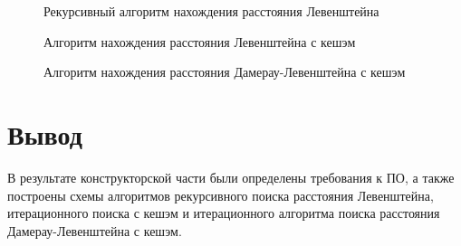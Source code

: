\clearpage

\begin{figure}
	\centering
	
	\caption{Рекурсивный алгоритм нахождения расстояния Левенштейна}
	\label{fig:rec}
\end{figure}

\clearpage

\begin{figure}
	\centering
	
	\caption{Алгоритм нахождения расстояния Левенштейна с кешэм}
	\label{fig:iter}
\end{figure}

\clearpage

\begin{figure}
	\centering
	
	\caption{Алгоритм нахождения расстояния Дамерау-Левенштейна с кешэм}
	\label{fig:damerau}
\end{figure}

\clearpage

\section{Вывод}

В результате конструкторской части были определены требования к ПО, а также построены схемы алгоритмов рекурсивного поиска расстояния Левенштейна, итерационного поиска с кешэм и итерационного алгоритма поиска расстояния Дамерау-Левенштейна с кешэм.

\clearpage